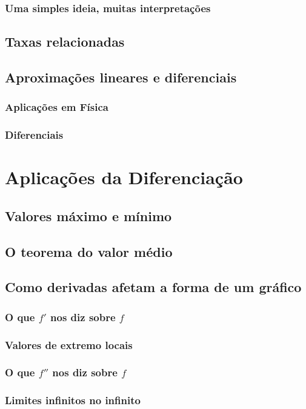 \subsubsection{Uma simples ideia, muitas interpretações}
\subsection{Taxas relacionadas}
\subsection{Aproximações lineares e diferenciais}
\subsubsection{Aplicações em Física}
\subsubsection{Diferenciais}
\section{Aplicações da Diferenciação}
\subsection{Valores máximo e mínimo}
\subsection{O teorema do valor médio}
\subsection{Como derivadas afetam a forma de um gráfico}
\subsubsection{O que $f'$ nos diz sobre $f$}
\subsubsection{Valores de extremo locais}
\subsubsection{O que $f''$ nos diz sobre $f$}
\subsubsection{Limites infinitos no infinito}
